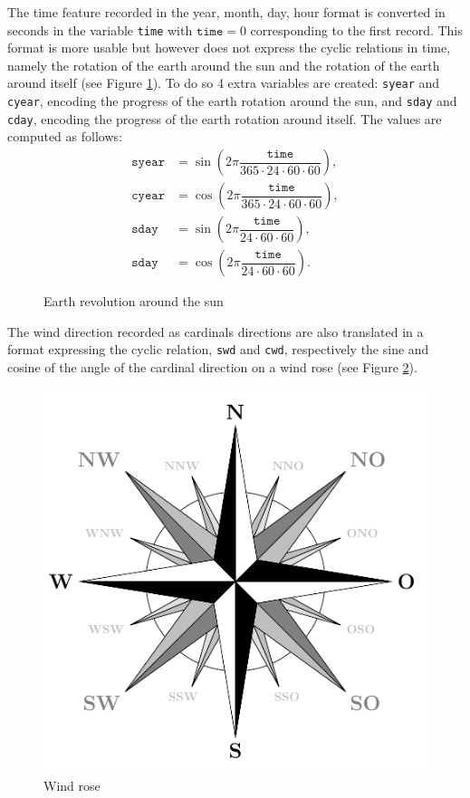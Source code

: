 \documentclass[journal,11pt]{IEEEtran}
\begin{document}
The time feature recorded in the year, month, day, hour format is converted in seconds in the variable \texttt{time} with $\texttt{time}=0$ corresponding to the first record. This format is more usable but however does not express the cyclic relations in time, namely the rotation of the earth around the sun and the rotation of the earth around itself (see Figure \ref{fig:earth_revolution}). To do so 4 extra variables are created: \texttt{syear} and \texttt{cyear}, encoding the progress of the earth rotation around the sun, and \texttt{sday} and \texttt{cday}, encoding the progress of the earth rotation around itself. The values are computed as follows: 
\begin{align*}
    \texttt{syear} &= \sin\left(2 \pi \dfrac{\texttt{time}}{365\cdot24 \cdot 60 \cdot 60}\right),\\
    \texttt{cyear} &= \cos\left(2 \pi \dfrac{\texttt{time}}{365\cdot24 \cdot 60 \cdot 60}\right),\\
    \texttt{sday} &= \sin\left(2 \pi \dfrac{\texttt{time}}{24 \cdot 60 \cdot 60}\right),\\
    \texttt{sday} &= \cos\left(2 \pi \dfrac{\texttt{time}}{24 \cdot 60 \cdot 60}\right).
\end{align*}


\begin{figure}[H]
    \centering
    
    \caption{Earth revolution around the sun}
    \label{fig:earth_revolution}
\end{figure}

The wind direction recorded as cardinals directions are also translated in a format expressing the cyclic relation, \texttt{swd} and \texttt{cwd}, respectively the sine and cosine of the angle of the cardinal direction on a wind rose (see Figure \ref{fig:wind_rose}). 

\begin{figure}[H]
    \centering
    \includegraphics[scale=0.3]{img/compass.pdf}
    \caption{Wind rose}
    \label{fig:wind_rose}
\end{figure}
\end{document}
